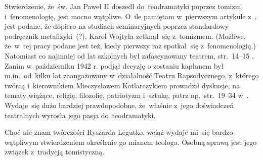 \documentclass[a4paper,11pt]{article}
\begin{document}
\newpage


\vspace{0em}



\vspace{0em}


\noindent
{} Stwierdzenie, że~św. Jan Paweł II doszedł do~teodramatyki poprzez
tomizm i~fenomenologię, jest mocno wątpliwe. O~ile pamiętam w~pierwszym
artykule z~\cite{PoslugaMysleniaTomIX2011}, jest podane, że dopiero na
studiach seminaryjnych poprzez standardowy podręcznik metafizyki~(?), Karol
Wojtyła zetknął~się z~tomizmem. (Możliwe, że~w~tej pracy podane jest też,
kiedy pierwszy raz spotkał~się z~fenomenologią.) Natomiast co najmniej od
lat szkolnych był zafascynowany teatrem, str.~14--15
\cite{NowakJanPawelIIKronikaZyciaIPontyfikatu2015}. Zanim w~październiku
1942 r. podjął decyzję o zostaniu kapłanem był m.in.~od~kilku lat
zaangażowany w~działalność Teatru Rapsodycznego, z~którego twórcą
i~kierownikiem Mieczysławem Kotlarczykiem prowadził dyskusje, na tematy
wiążące, religię, filozofię, patriotyzm i~sztukę, patrz np.~str.~19--34
w~\cite{NowakJanPawelIIKronikaZyciaIPontyfikatu2015}. Wydaje~się dużo
bardziej prawdopodobne, że~właśnie z~jego doświadczeń teatralnych
wyrosła jego pasja do~teodramatyki.

\vspace{\spaceFour}





\noindent
{} Choć nie znam twórczości Ryszarda Legutko, wciąż
wydaje mi~się bardzo wątpliwym stwierdzeniem określenie go mianem
teologa. Osobną sprawą jest jego związek z~tradycją tomistyczną.






\end{document}
